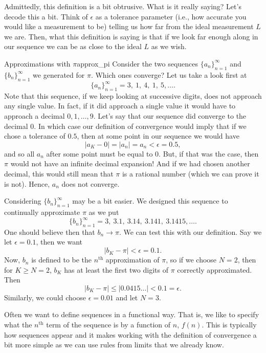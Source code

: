 Admittedly, this definition is a bit obtrusive.  What is it really saying?  Let's decode this a bit. Think of $\epsilon$ as a tolerance parameter (i.e., how accurate you would like a measurement to be) telling us how far from the ideal measurement $L$ we are. Then, what this definition is saying is that if we look far enough along in our sequence we can be as close to the ideal $L$ as we wish.  

\begin{ex}{Approximations with $\pi$}{approx_pi}
Consider the two sequences $\{a_n\}_{n=1}^\infty$ and $\{b_n\}_{n=1}^\infty$ we generated for $\pi$.  Which ones converge? Let us take a look first at
\[
\{a_n\}_{n=1}^\infty = 3,~1,~4,~1,~5, \dots.
\]
Note that this sequence, if we keep looking at successive digits, does not approach any single value.  In fact, if it did approach a single value it would have to approach a decimal $0,1,\dots, 9$.  Let's say that our sequence did converge to the decimal $0$. In which case our definition of convergence would imply that if we chose a tolerance of $0.5$, then at some point in our sequence we would have 
\[
|a_K - 0|=|a_n|=a_n<\epsilon=0.5,
\]
and so all $a_n$ after some point must be equal to $0$.  But, if that was the case, then $\pi$ would not have an infinite decimal expansion! And if we had chosen another decimal, this would still mean that $\pi$ is a rational number (which we can prove it is not). Hence, $a_n$ does not converge.

Considering $\{b_n\}_{n=1}^\infty$ may be a bit easier.  We designed this sequence to continually approximate $\pi$ as we put
\[
\{b_n\}_{n=1}^\infty = 3,~3.1, ~ 3.14, ~ 3.141, ~ 3.1415, \dots.
\]
One should believe then that $b_n\to \pi$.  We can test this with our definition.  Say we let $\epsilon = 0.1$, then we want
\[
|b_K-\pi|<\epsilon = 0.1.
\]
Now, $b_n$ is defined to be the $n^\textrm{th}$ approximation of $\pi$, so if we choose $N=2$, then for $K\geq N=2$, $b_K$ has at least the first two digits of $\pi$ correctly approximated.  Then
\[
|b_K - \pi| \leq |0.0415\dots | < 0.1 = \epsilon.
\]
Similarly, we could choose $\epsilon = 0.01$ and let $N=3$.  
\end{ex}

Often we want to define sequences in a functional way.  That is, we like to specify what the $n^\textrm{th}$ term of the sequence is by a function of $n$, $f(n)$. This is typically how sequences appear and it makes working with the definition of convergence a bit more simple as we can use rules from limits that we already know.

